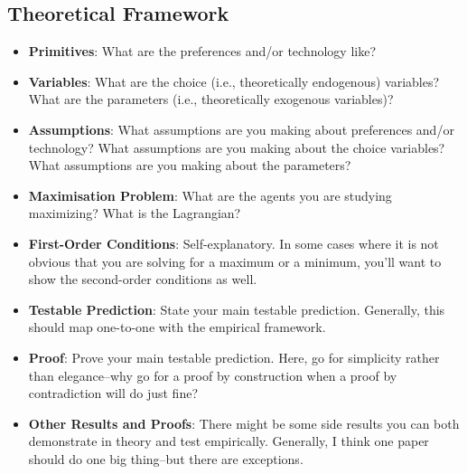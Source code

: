 \subsection{Theoretical Framework}
\begin{itemize}
\item \textbf{Primitives}: What are the preferences and/or technology like?
\item \textbf{Variables}: What are the choice (i.e., theoretically endogenous) variables? What are the parameters (i.e., theoretically exogenous variables)?
\item \textbf{Assumptions}: What assumptions are you making about preferences and/or technology? What assumptions are you making about the choice variables? What assumptions are you making about the parameters?
\item \textbf{Maximisation Problem}: What are the agents you are studying maximizing? What is the Lagrangian?
\item \textbf{First-Order Conditions}: Self-explanatory. In some cases where it is not obvious that you are solving for a maximum or a minimum, you’ll want to show the second-order conditions as well.
\item \textbf{Testable Prediction}: State your main testable prediction. Generally, this should map one-to-one with the empirical framework.
\item \textbf{Proof}: Prove your main testable prediction. Here, go for simplicity rather than elegance–why go for a proof by construction when a proof by contradiction will do just fine?
\item \textbf{Other Results and Proofs}: There might be some side results you can both demonstrate in theory and test empirically. Generally, I think one paper should do one big thing–but there are exceptions.
\end{itemize}

